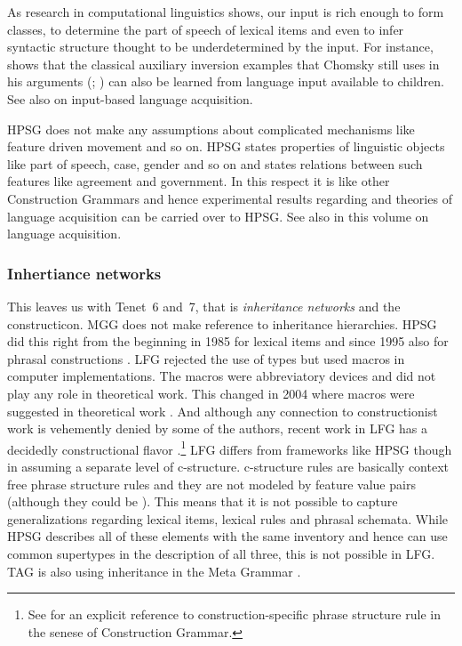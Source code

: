 \documentclass[output=paper]{langsci/langscibook}
\begin{document}
As research in computational linguistics shows, our input is rich
enough to form classes, to determine the part of speech of lexical items and even to infer syntactic
structure thought to be underdetermined by the input. For instance, \citet{Bod2009a} shows that the
classical auxiliary inversion examples that Chomsky still uses in his 
arguments (\citealp[--33]{Chomsky71a-u}; \citealp*{BPYC2011a}) can also be learned from language input available to children. See also
\citep{FPG2006a,FPAG2007a} on input-based language acquisition.

HPSG does not make any assumptions about complicated mechanisms like feature driven movement and so
on. HPSG states properties of linguistic objects like part of speech, case, gender and so on and
states relations between such features like agreement and government. In this respect it is like
other Construction Grammars and hence experimental results regarding and theories of language
acquisition can be carried over to HPSG. See also  in this volume on language
acquisition.


\subsubsection{Inhertiance networks}
\label{sec-inheritance}

This leaves us with Tenet~6 and~7, that is \emph{inheritance networks} and the constructicon. MGG does not make reference to inheritance
hierarchies. HPSG did this right from the beginning in 1985 \citep{FPW85a} for lexical items and
since 1995 also for phrasal constructions \citep{Sag97a}. LFG rejected the use of types but used
macros in computer implementations. The macros were abbreviatory devices and did not play any role in
theoretical work. This changed in 2004 where macros were suggested in theoretical work
\citep*{DKK2004a}. And although any connection to constructionist work is vehemently denied by some
of the authors, recent work in LFG has a decidedly constructional flavor
\citep*{ADT2008a,AGT2014a}.\footnote{
  See  for an explicit reference to construction-specific phrase
  structure rule in the senese of Construction Grammar.
}
LFG differs from frameworks like HPSG though in assuming a separate level of
c-structure. c-structure rules are basically context free phrase structure rules and they are not
modeled by feature value pairs (although they could be \citep{Kaplan95a}). This means that it is not
possible to capture generalizations regarding lexical items, lexical rules and phrasal
schemata. While HPSG describes all of these elements with the same inventory and hence can use
common supertypes in the description of all three, this is not possible in LFG.
TAG is also using inheritance in the Meta Grammar \citep{LK2017a}.
\end{document}
